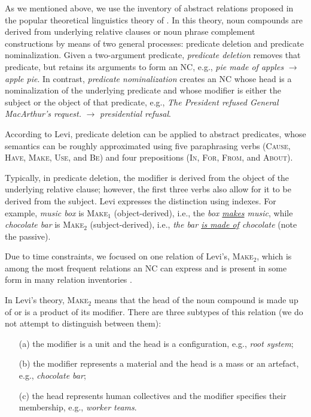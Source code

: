 \documentclass[letterpaper,11pt]{article}
\begin{document}
As  we mentioned  above, we  use the  inventory of  abstract relations
proposed   in   the   popular  theoretical   linguistics   theory   of
. In  this theory, noun compounds  are derived from
underlying relative clauses or noun phrase complement constructions by
means  of  two general  processes:  predicate  deletion and  predicate
nominalization.  Given   a  two-argument  predicate,   {\it  predicate
deletion} removes that predicate, but retains its arguments to form an
NC, e.g., {\it  pie made of apples} $\rightarrow$ {\it  apple pie}. In
contrast, {\it predicate nominalization} creates an NC whose head is a
nominalization  of  the underlying  predicate  and  whose modifier  is
either the  subject or the  object of  that predicate, e.g.,  {\it The
President  refused General  MacArthur's  request.} $\rightarrow$  {\it
presidential refusal}.

According  to Levi,  predicate  deletion can  be  applied to  abstract
predicates,  whose semantics  can be  roughly approximated  using five
paraphrasing  verbs   (\textsc{Cause},  \textsc{Have},  \textsc{Make},
\textsc{Use},  and \textsc{Be})  and  four prepositions  (\textsc{In},
\textsc{For},  \textsc{From},   and  \textsc{About}).

Typically,  in predicate deletion,  the modifier  is derived from  the object  of the
underlying relative clause; however, the  first three verbs also allow
for it to be derived from  the subject. Levi expresses the distinction
using  indexes. For  example,  \emph{music  box} is  \textsc{Make$_1$}
(object-derived), i.e., the  \emph{box \underline{makes} music}, while
\emph{chocolate  bar}  is \textsc{Make$_2$}  (subject-derived),  i.e.,
\emph{the bar \underline{is made of} chocolate} (note the passive).

Due  to  time constraints,  we  focused  on  one relation  of  Levi's,
\textsc{Make$_2$}, which  is among the  most frequent relations
an NC can express  and is present in some form in many relation inventories
\cite{warren:1978,Barker:1998,Rosario:2001,Nastase:Szpakowicz:2003,Girju:2005,Girju:2007:task4,girju09:lre,hendrickx-EtAl:2010:SemEval,Tratz:2010}.

In Levi's theory, \textsc{Make$_2$} means that the head of the noun compound is made up of
or is  a product of  its modifier. There  are three subtypes  of this
relation (we do not attempt to distinguish between them):

\begin{enumerate}
\item[(a)] the modifier is a unit and the head is a configuration, e.g., {\it root system};
\item[(b)] the modifier represents a material and the head is a mass or an artefact, e.g., {\it chocolate bar};
\item[(c)] the head represents human collectives and the modifier specifies their membership, e.g., {\it worker teams}.
\end{enumerate}
\end{document}

